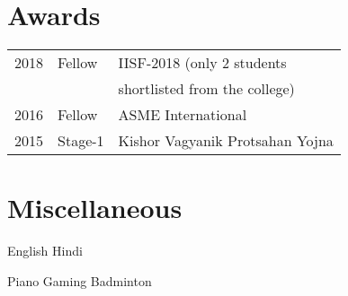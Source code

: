 \documentclass[]{limos-resume-openfont}
\begin{document}
\begin{minipage}[t]{1\textwidth}
\begin{multicols}{2}
\section{Awards} 
\begin{tabular}{rll}
2018	     & Fellow  & IISF-2018 (only 2 students\\
             &          &shortlisted from the college)\\
2016	     & Fellow  & ASME International\\

2015     & Stage-1  & Kishor Vagyanik Protsahan Yojna \\
\end{tabular}
\sectionsep
\section{Miscellaneous}
English \textbullet{}\textbullet{}\textbullet{}\textbullet{} \quad
Hindi  \textbullet{}\textbullet{}\textbullet{}\textbullet{}\textbullet{}\\
\sectionsep

Piano \textbullet{} Gaming \textbullet{} Badminton\\
\sectionsep
\end{multicols}
\end{minipage} 
\end{document}
